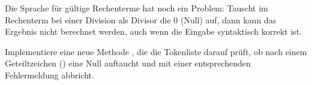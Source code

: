 \documentclass[10pt, a4paper]{scrartcl}
\begin{document}
\begin{aufgabe}[subtitle=Semantische Analyse,symbol=\symStern]
	\label{aufg:semantik}
	Die Sprache für gültige Rechenterme hat noch ein Problem: Tauscht im Rechenterm bei einer
	Division als Divisor die 0 (Null) auf, dann kann das Ergebnis nicht berechnet werden, auch wenn
	die Eingabe syntaktisch korrekt ist.

	Implementiere eine neue Methode , die die Tokenliste darauf prüft,
	ob nach einem Geteiltzeichen (\code{:}) eine Null auftaucht und mit einer entsprechenden
	Fehlermeldung abbricht.
\end{aufgabe}
\end{document}
